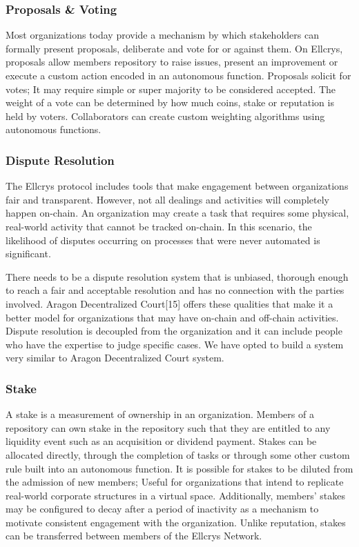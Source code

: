 \subsubsection{Proposals \& Voting}
Most organizations today provide a mechanism by which stakeholders can formally present proposals, deliberate and vote for or against them. On Ellcrys, proposals allow members repository to raise issues, present an improvement or execute a custom action encoded in an autonomous function. Proposals solicit for votes; It may require simple or super majority to be considered accepted. The weight of a vote can be determined by how much coins, stake or reputation is held by voters. Collaborators can create custom weighting algorithms using autonomous functions.

\subsubsection{Dispute Resolution}
The Ellcrys protocol includes tools that make engagement between organizations fair and transparent. However, not all dealings and activities will completely happen on-chain. An organization may create a task that requires some physical, real-world activity that cannot be tracked on-chain. In this scenario, the likelihood of disputes occurring on processes that were never automated is significant.

There needs to be a dispute resolution system that is unbiased, thorough enough to reach a fair and acceptable resolution and has no connection with the parties involved. Aragon Decentralized Court[15] offers these qualities that make it a better model for organizations that may have on-chain and off-chain activities. Dispute resolution is decoupled from the organization and it can include people who have the expertise to judge specific cases. We have opted to build a system very similar to Aragon Decentralized Court system.

\subsubsection{Stake}
A stake is a measurement of ownership in an organization. Members of a repository can own stake in the repository such that they are entitled to any liquidity event such as an acquisition or dividend payment. Stakes can be allocated directly, through the completion of tasks or through some other custom rule built into an autonomous function. It is possible for stakes to be diluted from the admission of new members; Useful for organizations that intend to replicate real-world corporate structures in a virtual space. Additionally, members’ stakes may be configured to decay after a period of inactivity as a mechanism to motivate consistent engagement with the organization. Unlike reputation, stakes can be transferred between members of the Ellcrys Network.

